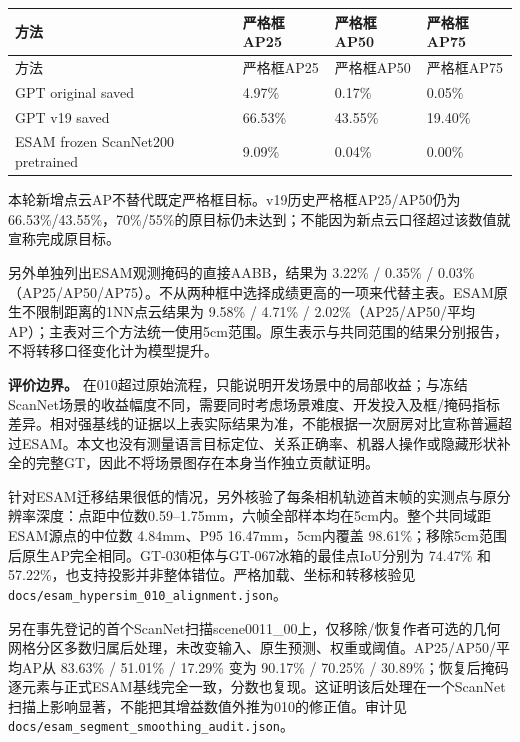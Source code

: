 \documentclass[UTF8,fontset=fandol]{ctexart}
\begin{document}
{\small
\begin{longtable}{|p{}|p{}|p{}|p{}|}
\hline
方法 & 严格框AP25 & 严格框AP50 & 严格框AP75 \\ \hline
\endfirsthead
\hline
方法 & 严格框AP25 & 严格框AP50 & 严格框AP75 \\ \hline
\endhead
GPT original saved & 4.97\% & 0.17\% & 0.05\% \\ \hline
GPT v19 saved & 66.53\% & 43.55\% & 19.40\% \\ \hline
ESAM frozen ScanNet200 pretrained & 9.09\% & 0.04\% & 0.00\% \\ \hline
\end{longtable}
}

本轮新增点云AP不替代既定严格框目标。v19历史严格框AP25/AP50仍为66.53\%/43.55\%，70\%/55\%的原目标仍未达到；不能因为新点云口径超过该数值就宣称完成原目标。



另外单独列出ESAM观测掩码的直接AABB，结果为 3.22\% / 0.35\% / 0.03\%（AP25/AP50/AP75）。不从两种框中选择成绩更高的一项来代替主表。ESAM原生不限制距离的1NN点云结果为 9.58\% / 4.71\% / 2.02\%（AP25/AP50/平均AP）；主表对三个方法统一使用5cm范围。原生表示与共同范围的结果分别报告，不将转移口径变化计为模型提升。



\textbf{评价边界。} 在010超过原始流程，只能说明开发场景中的局部收益；与冻结ScanNet场景的收益幅度不同，需要同时考虑场景难度、开发投入及框/掩码指标差异。相对强基线的证据以上表实际结果为准，不能根据一次厨房对比宣称普遍超过ESAM。本文也没有测量语言目标定位、关系正确率、机器人操作或隐藏形状补全的完整GT，因此不将场景图存在本身当作独立贡献证明。



针对ESAM迁移结果很低的情况，另外核验了每条相机轨迹首末帧的实测点与原分辨率深度：点距中位数0.59–1.75mm，六帧全部样本均在5cm内。整个共同域距ESAM源点的中位数 4.84mm、P95 16.47mm，5cm内覆盖 98.61\%；移除5cm范围后原生AP完全相同。GT-030柜体与GT-067冰箱的最佳点IoU分别为 74.47\% 和 57.22\%，也支持投影并非整体错位。严格加载、坐标和转移核验见 \texttt{docs/\allowbreak{}esam\_\allowbreak{}hypersim\_\allowbreak{}010\_\allowbreak{}alignment.\allowbreak{}json}。



另在事先登记的首个ScanNet扫描scene0011\_00上，仅移除/恢复作者可选的几何网格分区多数归属后处理，未改变输入、原生预测、权重或阈值。AP25/AP50/平均AP从 83.63\% / 51.01\% / 17.29\% 变为 90.17\% / 70.25\% / 30.89\%；恢复后掩码逐元素与正式ESAM基线完全一致，分数也复现。这证明该后处理在一个ScanNet扫描上影响显著，不能把其增益数值外推为010的修正值。审计见 \texttt{docs/\allowbreak{}esam\_\allowbreak{}segment\_\allowbreak{}smoothing\_\allowbreak{}audit.\allowbreak{}json}。
\end{document}
